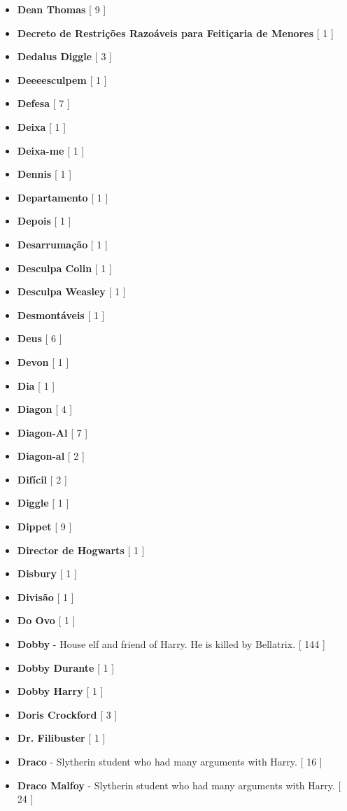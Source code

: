 \documentclass[a4paper]{article}
\begin{document}
\begin{itemize}
	\item \textbf{Dean Thomas} [ 9 ]
	\item \textbf{Decreto de Restrições Razoáveis para Feitiçaria de Menores} [ 1 ]
	\item \textbf{Dedalus Diggle} [ 3 ]
	\item \textbf{Deeeesculpem} [ 1 ]
	\item \textbf{Defesa} [ 7 ]
	\item \textbf{Deixa} [ 1 ]
	\item \textbf{Deixa-me} [ 1 ]
	\item \textbf{Dennis} [ 1 ]
	\item \textbf{Departamento} [ 1 ]
	\item \textbf{Depois} [ 1 ]
	\item \textbf{Desarrumação} [ 1 ]
	\item \textbf{Desculpa Colin} [ 1 ]
	\item \textbf{Desculpa Weasley} [ 1 ]
	\item \textbf{Desmontáveis} [ 1 ]
	\item \textbf{Deus} [ 6 ]
	\item \textbf{Devon} [ 1 ]
	\item \textbf{Dia} [ 1 ]
	\item \textbf{Diagon} [ 4 ]
	\item \textbf{Diagon-Al} [ 7 ]
	\item \textbf{Diagon-al} [ 2 ]
	\item \textbf{Difícil} [ 2 ]
	\item \textbf{Diggle} [ 1 ]
	\item \textbf{Dippet} [ 9 ]
	\item \textbf{Director de Hogwarts} [ 1 ]
	\item \textbf{Disbury} [ 1 ]
	\item \textbf{Divisão} [ 1 ]
	\item \textbf{Do Ovo} [ 1 ]
	\item \textbf{Dobby} - House elf and friend of Harry. He is killed by Bellatrix. [ 144 ]
	\item \textbf{Dobby Durante} [ 1 ]
	\item \textbf{Dobby Harry} [ 1 ]
	\item \textbf{Doris Crockford} [ 3 ]
	\item \textbf{Dr. Filibuster} [ 1 ]
	\item \textbf{Draco} - Slytherin student who had many arguments with Harry. [ 16 ]
	\item \textbf{Draco Malfoy} - Slytherin student who had many arguments with Harry. [ 24 ]

\end{itemize}
\end{document}

